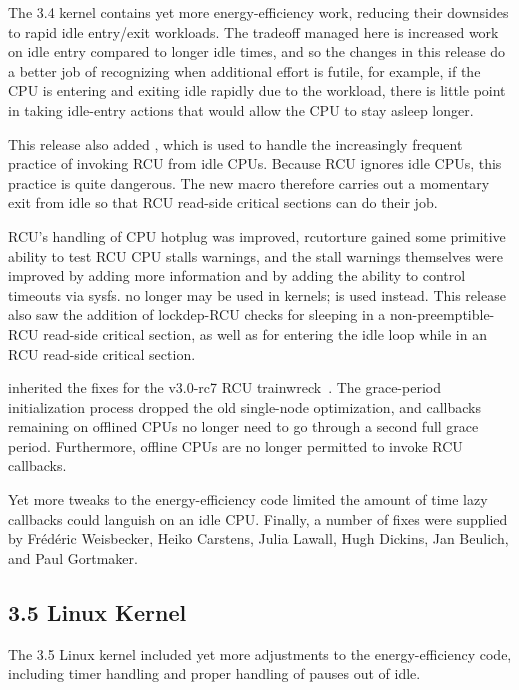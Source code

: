 The 3.4 kernel contains yet more energy-efficiency work, reducing their
downsides to rapid idle entry/exit workloads.
The tradeoff managed here is increased work on idle entry compared to
longer idle times, and so the changes in this release do a better job of
recognizing when additional effort is futile, for example, if the
CPU is entering and exiting idle rapidly due to the workload, there is
little point in taking idle-entry actions that would allow the CPU to
stay asleep longer.

This release also added , which is used to handle
the increasingly frequent practice of invoking RCU from idle CPUs.
Because RCU ignores idle CPUs, this practice is quite dangerous.
The new  macro therefore carries out a momentary
exit from idle so that RCU read-side critical sections can do their job.

RCU's handling of CPU hotplug was improved, rcutorture gained some
primitive ability to test RCU CPU stalls warnings, and the stall
warnings themselves were improved by adding more information and
by adding the ability to control timeouts via sysfs.
 no longer may be used in  kernels;
 is used instead.
This release also saw the addition of lockdep-RCU checks for sleeping
in a non-preemptible-RCU read-side critical section, as well as for
entering the idle loop while in an RCU read-side critical section.

 inherited the  fixes for the v3.0-rc7 RCU
trainwreck~\cite{PaulEMcKenney2011RCU3.0trainwreck}.
The grace-period initialization process dropped the old single-node
optimization, and callbacks remaining on offlined CPUs no longer
need to go through a second full grace period.
Furthermore, offline CPUs are no longer permitted to invoke RCU
callbacks.

Yet more tweaks to the energy-efficiency code limited the amount of
time lazy callbacks could languish on an idle CPU.
Finally, a number of fixes were supplied by Fr\'ed\'eric Weisbecker,
Heiko Carstens, Julia Lawall, Hugh Dickins, Jan Beulich, and Paul
Gortmaker.

\subsection{3.5 Linux Kernel}

The 3.5 Linux kernel included yet more adjustments to the
 energy-efficiency code, including timer
handling and proper handling of  pauses out of
idle.

